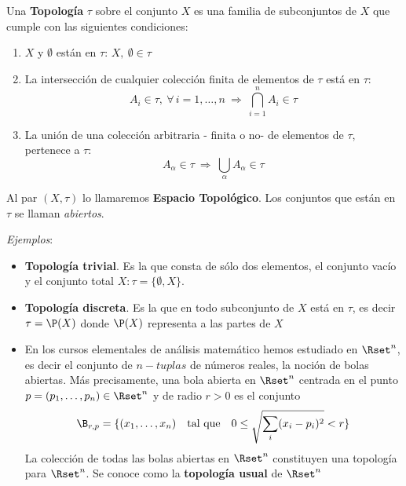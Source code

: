 \begin{definicion}
  Una  {\bf  Topolog\'ia}  $\tau$  sobre  el  conjunto $X$  es  una  familia  de
  subconjuntos de $X$ que cumple con las siguientes condiciones:
  \begin{enumerate}
  \item $X$ y $\emptyset$ est\'an en $\tau$: $X, \: \emptyset \in \tau$
  \item La intersecci\'on de cualquier colecci\'on finita de elementos de $\tau$
    est\'a en $\tau$:
    \[
    A_i  \in  \tau,  \  \forall \,  i  =  1  ,  \ldots  , n  \:  \Rightarrow  \:
    \bigcap_{i=1}^n A_i \in \tau
    \]
  \item La uni\'on de una colecci\'on  arbitraria - finita o no- de elementos de
    $\tau$, pertenece a $\tau$:
    \[
    A_\alpha \in \tau \: \Rightarrow \: \bigcup_\alpha A_\alpha \in \tau
    \]
\end{enumerate}
\end{definicion}

\begin{definicion}
  Al par $(X,\tau)$ lo llamaremos  {\bf Espacio Topol\'ogico}. Los conjuntos que
  est\'an en $\tau$ se llaman {\it abiertos}.
\end{definicion}

{\it Ejemplos}:

\begin{itemize}
\item {\bf  Topolog\'ia trivial}. Es la  que consta de s\'olo  dos elementos, el
  conjunto vac\'io y el conjunto total $X: \tau = \{ \emptyset , X \}$.
% 
\item {\bf Topolog\'ia discreta}. Es la que en todo subconjunto de $X$ est\'a en
  $\tau$, es decir $\tau = \P(X)$ donde $\P(X)$ representa a las partes de $X$
    
\item En  los cursos elementales  de an\'alisis matem\'atico hemos  estudiado en
  $\Rset^n$, es decir el conjunto de $n-tuplas$ de n\'umeros reales, la noci\'on
  de bolas abiertas. M\'as precisamente,  una bola abierta en $\Rset^n$ centrada
  en el  punto $p =  (p_1 , \ldots ,  p_n) \in \Rset^n$  y de radio $r>0$  es el
  conjunto
  \[
  \B_{r,p}  =  \{ (x_1  ,  \ldots  , x_n)  \quad  \mbox{tal  que}  \quad 0  \leq
  \sqrt{\sum_i (x_i-p_i)^2} < r \}
  \]
  La  colecci\'on de  todas  las  bolas abiertas  en  $\Rset^n$ constituyen  una
  topolog\'ia  para $\Rset^n$.  Se conoce  como  la {\bf  topolog\'ia usual}  de
  $\Rset^n$
\end{itemize}

